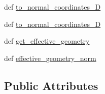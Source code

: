 \begin{DoxyCompactItemize}
\item 
def \hyperlink{classMolecule_1_1Molecule_ae1292d157a94d00e99952e89ead7b2e7}{to\+\_\+normal\+\_\+coordinates\+\_\+D}
\item 
def \hyperlink{classMolecule_1_1Molecule_af787ecd17f7d951af4864b6385bdb53d}{to\+\_\+normal\+\_\+coordinates\+\_\+D}
\item 
def \hyperlink{classMolecule_1_1Molecule_af702cb533e33ab267e8a22298cf931bd}{get\+\_\+effective\+\_\+geometry}
\item 
def \hyperlink{classMolecule_1_1Molecule_a288f39b8931acfcb66efe859d1536adb}{effective\+\_\+geometry\+\_\+norm}
\end{DoxyCompactItemize}
\subsection*{Public Attributes}
